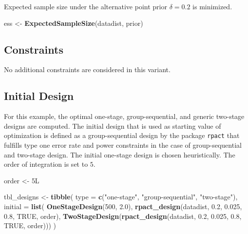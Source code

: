 \documentclass[
]{book}
\newenvironment{Shaded}{\begin{snugshade}}{\end{snugshade}}
\newcommand{\DataTypeTok}[1]{\textcolor[rgb]{0.13,0.29,0.53}{#1}}
\newcommand{\DecValTok}[1]{\textcolor[rgb]{0.00,0.00,0.81}{#1}}
\newcommand{\FloatTok}[1]{\textcolor[rgb]{0.00,0.00,0.81}{#1}}
\newcommand{\KeywordTok}[1]{\textcolor[rgb]{0.13,0.29,0.53}{\textbf{#1}}}
\newcommand{\NormalTok}[1]{#1}
\newcommand{\OtherTok}[1]{\textcolor[rgb]{0.56,0.35,0.01}{#1}}
\newcommand{\StringTok}[1]{\textcolor[rgb]{0.31,0.60,0.02}{#1}}
\begin{document}
Expected sample size under the alternative point prior \(\delta = 0.2\)
is minimized.

\begin{Shaded}
\begin{Highlighting}[]
\NormalTok{ess \textless{}{-}}\StringTok{ }\KeywordTok{ExpectedSampleSize}\NormalTok{(datadist, prior)}
\end{Highlighting}
\end{Shaded}

\hypertarget{constraints-7}{%
\subsection{Constraints}\label{constraints-7}}

No additional constraints are considered in this variant.

\hypertarget{initial-design-5}{%
\subsection{Initial Design}\label{initial-design-5}}

For this example, the optimal one-stage, group-sequential, and generic
two-stage designs are computed.
The initial design that is used as starting value of optimization is defined
as a group-sequential design by the package \texttt{rpact} that fulfills
type one error rate and power constraints in the case of group-sequential and
two-stage design.
The initial one-stage design is chosen heuristically.
The order of integration is set to \(5\).

\begin{Shaded}
\begin{Highlighting}[]
\NormalTok{order \textless{}{-}}\StringTok{ }\NormalTok{5L }

\NormalTok{tbl\_designs \textless{}{-}}\StringTok{ }\KeywordTok{tibble}\NormalTok{(}
    \DataTypeTok{type    =} \KeywordTok{c}\NormalTok{(}\StringTok{"one{-}stage"}\NormalTok{, }\StringTok{"group{-}sequential"}\NormalTok{, }\StringTok{"two{-}stage"}\NormalTok{),}
    \DataTypeTok{initial =} \KeywordTok{list}\NormalTok{(}
        \KeywordTok{OneStageDesign}\NormalTok{(}\DecValTok{500}\NormalTok{, }\FloatTok{2.0}\NormalTok{),}
        \KeywordTok{rpact\_design}\NormalTok{(datadist, }\FloatTok{0.2}\NormalTok{, }\FloatTok{0.025}\NormalTok{, }\FloatTok{0.8}\NormalTok{, }\OtherTok{TRUE}\NormalTok{, order),}
        \KeywordTok{TwoStageDesign}\NormalTok{(}\KeywordTok{rpact\_design}\NormalTok{(datadist, }\FloatTok{0.2}\NormalTok{, }\FloatTok{0.025}\NormalTok{, }\FloatTok{0.8}\NormalTok{, }\OtherTok{TRUE}\NormalTok{, order))) )}
\end{Highlighting}
\end{Shaded}
\end{document}
